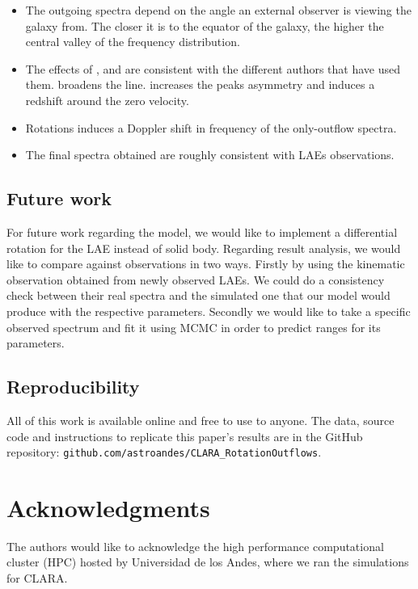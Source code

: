 \documentclass[twocolappendix]{latex/emulateapj}
\begin{document}
\begin{itemize}
	\item The outgoing spectra depend on the angle an external observer is viewing the galaxy from. The closer it is to the equator of the galaxy, the higher the central valley of the frequency distribution. 
	
	\item The effects of \vrot, \vout and \tauh are consistent with the different authors that have used them. \vrot broadens the \lya line. \vout increases the peaks asymmetry and \tauh induces a redshift around the zero velocity.
	
	\item Rotations induces a Doppler shift in frequency of the only-outflow spectra.
	
	\item The final spectra obtained are roughly consistent with LAEs observations. \\ 

\end{itemize}

\subsection{Future work}

For future work regarding the model, we would like to implement a differential rotation for the LAE instead of solid body. Regarding result analysis, we would like to compare against observations in two ways. Firstly by using the kinematic observation obtained from newly observed LAEs. We could do a consistency check between their real spectra and the simulated one that our model would produce with the respective parameters. Secondly we would like to take a specific observed spectrum and fit it using MCMC in order to predict ranges for its parameters. \\

\subsection{Reproducibility}

All of this work is available online and free to use to anyone. The data, source code and instructions to replicate this paper's results are in the GitHub repository:  \texttt{github.com/astroandes/CLARA\_RotationOutflows}. \\


\section*{Acknowledgments}
The authors would like to acknowledge the high performance computational cluster (HPC) hosted by Universidad de los Andes, where we ran the simulations for CLARA. \\
\end{document}
